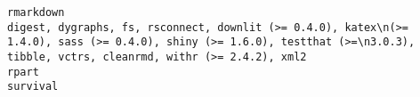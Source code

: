\documentclass[
  letterpaper,
  DIV=11,
  numbers=noendperiod]{scrreprt}
\begin{document}
\begin{verbatim}
rmarkdown                                                                                                                                                                                                                                                                                                                                                                                                                                                                                                                                                                                                                                                                                                                                                                                                                                                                                                                                                                                                                                                                                                                    digest, dygraphs, fs, rsconnect, downlit (>= 0.4.0), katex\n(>= 1.4.0), sass (>= 0.4.0), shiny (>= 1.6.0), testthat (>=\n3.0.3), tibble, vctrs, cleanrmd, withr (>= 2.4.2), xml2
rpart                                                                                                                                                                                                                                                                                                                                                                                                                                                                                                                                                                                                                                                                                                                                                                                                                                                                                                                                                                                                                                                                                                                                                                                                                                                                                                survival

\end{verbatim}
\end{document}
